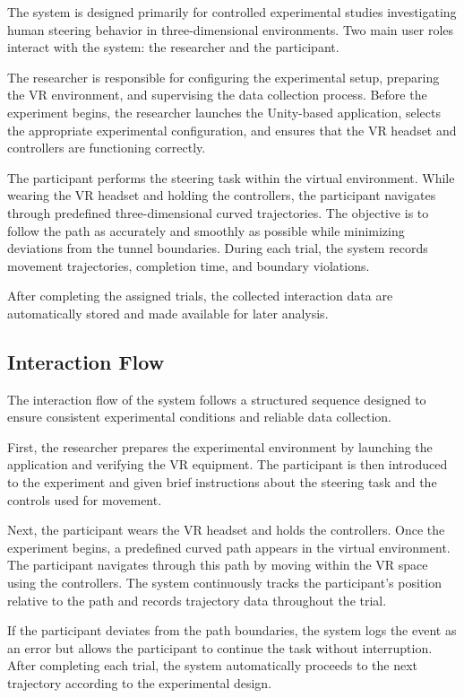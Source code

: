 \documentclass[sigconf]{acmart}
\begin{document}
The system is designed primarily for controlled experimental studies investigating human steering behavior in three-dimensional environments. Two main user roles interact with the system: the researcher and the participant.

The researcher is responsible for configuring the experimental setup, preparing the VR environment, and supervising the data collection process. Before the experiment begins, the researcher launches the Unity-based application, selects the appropriate experimental configuration, and ensures that the VR headset and controllers are functioning correctly.

The participant performs the steering task within the virtual environment. While wearing the VR headset and holding the controllers, the participant navigates through predefined three-dimensional curved trajectories. The objective is to follow the path as accurately and smoothly as possible while minimizing deviations from the tunnel boundaries. During each trial, the system records movement trajectories, completion time, and boundary violations.

After completing the assigned trials, the collected interaction data are automatically stored and made available for later analysis.

\subsection{Interaction Flow}

The interaction flow of the system follows a structured sequence designed to ensure consistent experimental conditions and reliable data collection.

First, the researcher prepares the experimental environment by launching the application and verifying the VR equipment. The participant is then introduced to the experiment and given brief instructions about the steering task and the controls used for movement.

Next, the participant wears the VR headset and holds the controllers. Once the experiment begins, a predefined curved path appears in the virtual environment. The participant navigates through this path by moving within the VR space using the controllers. The system continuously tracks the participant’s position relative to the path and records trajectory data throughout the trial.

If the participant deviates from the path boundaries, the system logs the event as an error but allows the participant to continue the task without interruption. After completing each trial, the system automatically proceeds to the next trajectory according to the experimental design.
\end{document}
